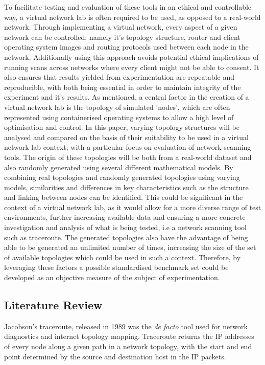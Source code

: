 To facilitate testing and evaluation of these tools in an ethical and controllable way, a virtual network lab is often required to be used, as opposed to a real-world network. Through implementing a virtual network, every aspect of a given network can be controlled; namely it's topology structure, router and client operating system images and routing protocols used between each node in the network. Additionally using this approach avoids potential ethical implications of running scans across networks where every client might not be able to consent. It also ensures that results yielded from experimentation are repeatable and reproducible, with both being essential in order to maintain integrity of the experiment and it's results. As mentioned, a central factor in the creation of a virtual network lab is the topology of simulated 'nodes', which are often represented using containerised operating systems to allow a high level of optimisation and control. In this paper, varying topology structures will be analysed and compared on the basis of their suitability to be used in a virtual network lab context; with a particular focus on evaluation of network scanning tools. The origin of these topologies will be both from a real-world dataset and also randomly generated using several different mathematical models. By combining real topologies and randomly generated topologies using varying models, similarities and differences in key characteristics such as the structure and linking between nodes can be identified. This could be significant in the context of a virtual network lab, as it would allow for a more diverse range of test environments, further increasing available data and ensuring a more concrete investigation and analysis of what is being tested, i.e a network scanning tool such as traceroute. The generated topologies also have the advantage of being able to be generated an unlimited number of times, increasing the size of the set of available topologies which could be used in such a context. Therefore, by leveraging these factors a possible standardised benchmark set could be developed as an objective measure of the subject of experimentation. 
\subsection{Literature Review}


Jacobson's traceroute, released in 1989 was the \textit{de facto} tool used for network diagnostics and internet topology mapping.
Traceroute returns the IP addresses of every node along a given path in a network topology, with the start and end point determined by the source and destination host in the IP packets.\cite{jacobson1989traceroute}


